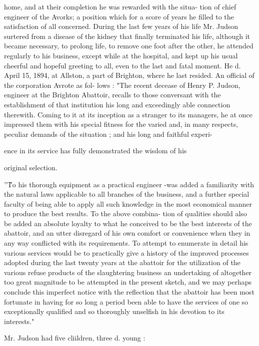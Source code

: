\documentclass{book}
\begin{document}
home, and at their completion he was rewarded with the situa- 
tion of chief engineer of the Avorks; a position which for a 
score of years he filled to the satisfaction of all concerned. 
During the last few years of his life Mr. Judson surtered from 
a disease of the kidney that finally terminated his life, 
although it became necessary, to prolong life, to remove 
one foot after the other, he attended regularly to his business, 
except while at the hospital, and kept up his usual cheerful 
and hopeful greeting to all, even to the last and fatal moment. 
He d. April 15, 1894, at Allston, a part of Brighton, where 
he last resided. An official of the corporation Avrote as fol- 
lows : "The recent decease of Henry P. Judson, engineer 
at the Brighton Abattoir, recalls to those conversant with the 
establishment of that institution his long and exceedingly 
able connection therewith. Coming to it at its inception as a 
stranger to its managers, he at once impressed them with his 
special fitness for the varied and, in many respects, peculiar 
demands of the situation ; and his long and faithful experi- 




 ence in its service has fully demonstrated the wisdom of his 

original selection. 

''\^To his thorough equipment as a practical engineer -was 
added a familiarity with the natural laws applicable to all 
branches of the business, and a further special faculty of 
being able to apply all such knowledge in the most economical 
manner to produce the best results. To the above combina- 
tion of qualities should also be added an absolute loyalty to 
what he conceived to be the best interests of the abattoir, 
and an utter disregard of his own comfort or convenience 
when they in any way conflicted with its requirements. To 
attempt to enumerate in detail his various services would be 
to practically give a history of the improved processes 
adopted during the last twenty years at the abattoir for the 
utilization of the various refuse products of the slaughtering 
business  an undertaking of altogether too great magnitude 
to be attempted in the present sketch, and we may perhaps 
conclude this imperfect notice with the reflection that the 
abattoir has been most fortunate in having for so long a 
period been able to have the services of one so exceptionally 
qualified and so thoroughly unselfish in his devotion to its 
interests." 

Mr. Judson had five cliildren, three d. young : 
\end{document}
